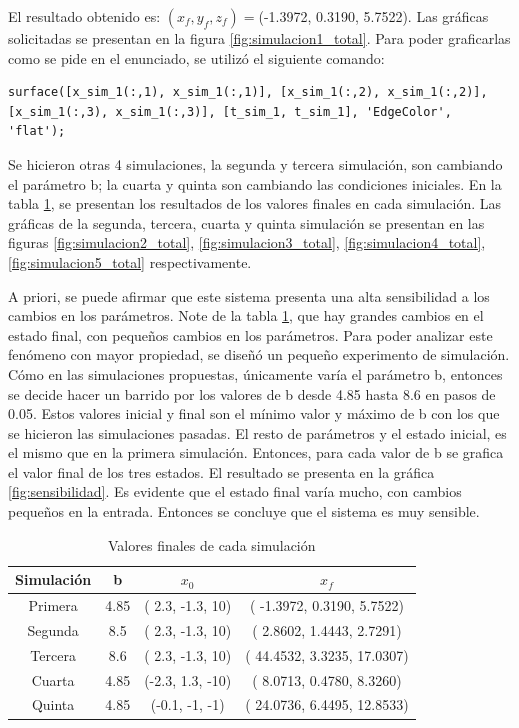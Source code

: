 \documentclass[12pt,letterpaper]{article}
\begin{document}
El resultado obtenido es: $(x_f, y_f, z_f)=$(-1.3972, 0.3190, 5.7522).
Las gráficas solicitadas se presentan en la figura \ref{fig:simulacion1_total}. Para poder graficarlas como se pide en el enunciado, se utilizó el siguiente comando:

\begin{lstlisting}[style=Matlab-editor, basicstyle=\mlttfamily]
    surface([x_sim_1(:,1), x_sim_1(:,1)], [x_sim_1(:,2), x_sim_1(:,2)], [x_sim_1(:,3), x_sim_1(:,3)], [t_sim_1, t_sim_1], 'EdgeColor', 'flat');
\end{lstlisting}

Se hicieron otras 4 simulaciones, la segunda y tercera simulación, son cambiando el parámetro b; la cuarta y quinta son cambiando las condiciones iniciales. En la tabla \ref{table:finales_ejercicio_1}, se presentan los resultados de los valores finales en cada simulación. Las gráficas de la segunda, tercera, cuarta y quinta simulación se presentan en las figuras \ref{fig:simulacion2_total}, \ref{fig:simulacion3_total}, \ref{fig:simulacion4_total}, \ref{fig:simulacion5_total} respectivamente. 

A priori, se puede afirmar que este sistema presenta una alta sensibilidad a los cambios en los parámetros. Note de la tabla \ref{table:finales_ejercicio_1}, que hay grandes cambios en el estado final, con pequeños cambios en los parámetros. Para poder analizar este fenómeno con mayor propiedad, se diseñó un pequeño experimento de simulación. Cómo en las simulaciones propuestas, únicamente varía el parámetro b, entonces se decide hacer un barrido por los valores de b desde 4.85 hasta 8.6 en pasos de 0.05. Estos valores inicial y final son el mínimo valor y máximo de b con los que se hicieron las simulaciones pasadas. El resto de parámetros y el estado inicial, es el mismo que en la primera simulación. Entonces, para cada valor de b se grafica el valor final de los tres estados. El resultado se presenta en la gráfica \ref{fig:sensibilidad}. Es evidente que el estado final varía mucho, con cambios pequeños en la entrada. Entonces se concluye que el sistema es muy sensible.

 




\begin{table}
\caption{Valores finales de cada simulación}
\label{table:finales_ejercicio_1}
\centering
\begin{tabular}{| c | c  c  c|}
  \hline
 Simulación & b   & $x_0$   & $x_f$   \\
 \hline
 Primera    & 4.85&( 2.3, -1.3,  10) &( -1.3972, 0.3190, 5.7522) \\
 Segunda    & 8.5& ( 2.3, -1.3,  10) &( 2.8602,  1.4443, 2.7291) \\
 Tercera    & 8.6& ( 2.3, -1.3,  10) &( 44.4532, 3.3235, 17.0307)\\
 Cuarta     & 4.85&(-2.3,  1.3, -10) &( 8.0713,  0.4780, 8.3260)\\
 Quinta     & 4.85&(-0.1, -1,    -1) &( 24.0736, 6.4495, 12.8533)\\
 \hline

\end{tabular}
\end{table}
\end{document}
